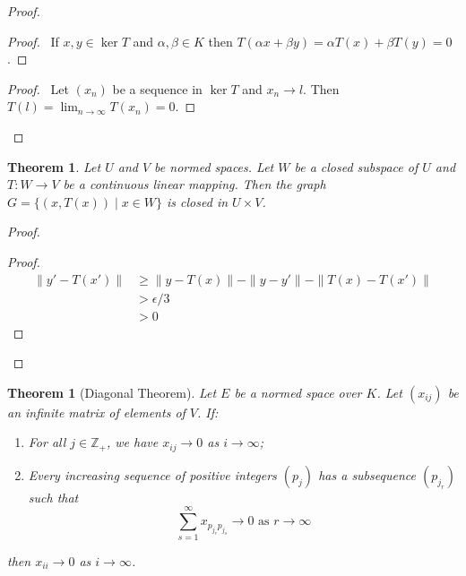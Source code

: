 \documentclass{book}
\let\qed\relax
\newtheorem{thm}[ax]{Theorem}
\theoremstyle{definition}
\begin{document}
\begin{proof}
\pf
{}
\begin{proof}
	\pf\ If $x,y \in \ker T$ and $\alpha, \beta \in K$ then $T(\alpha x + \beta y) = \alpha T(x) + \beta T(y) = 0$.
\end{proof}
\begin{proof}
	\pf\ Let $(x_n)$ be a sequence in $\ker T$ and $x_n \rightarrow l$. Then $T(l) = \lim_{n \rightarrow \infty} T(x_n) = 0$.
\end{proof}
\qed
\end{proof}

\begin{thm}
Let $U$ and $V$ be normed spaces. Let $W$ be a closed subspace of $U$ and $T : W \rightarrow V$ be a continuous linear mapping. Then the graph $G = \{(x,T(x)) \mid x \in W \}$ is closed in $U \times V$.
\end{thm}

\begin{proof}
\pf
{}
\begin{proof}
	\pf
	\begin{align*}
		\| y' - T(x')\| & \geq \| y - T(x) \| - \| y - y' \| - \|T(x) - T(x')\| \\
		& > \epsilon /3 \\
		& > 0
	\end{align*}
\end{proof}
\qed
\end{proof}

\begin{thm}[Diagonal Theorem]
Let $E$ be a normed space over $K$. Let $(x_{ij})$ be an infinite matrix of elements of $V$. If:
\begin{enumerate}
\item For all $j \in \mathbb{Z}_+$, we have $x_{ij} \rightarrow 0$ as $i \rightarrow \infty$;
\item Every increasing sequence of positive integers $(p_j)$ has a subsequence $(p_{j_r})$ such that 
\[ \sum_{s=1}^\infty x_{p_{j_r}p_{j_s}} \rightarrow 0 \text{ as } r \rightarrow \infty \]
\end{enumerate}
then $x_{ii} \rightarrow 0$ as $i \rightarrow \infty$.
\end{thm}
\end{document}
